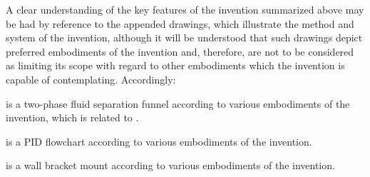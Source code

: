 
A clear understanding of the key features of the invention summarized above may be had 
by reference to the appended drawings, which illustrate the method and system of the 
invention, although it will be understood that such drawings depict preferred 
embodiments of the invention and, therefore, are not to be considered as limiting its 
scope with regard to other embodiments which the invention is capable of contemplating. 
Accordingly:


 is a two-phase fluid separation funnel according to various embodiments of the invention, which is related to .


 is a PID flowchart according to various embodiments of the invention.


 is a wall bracket mount according to various embodiments of the invention.